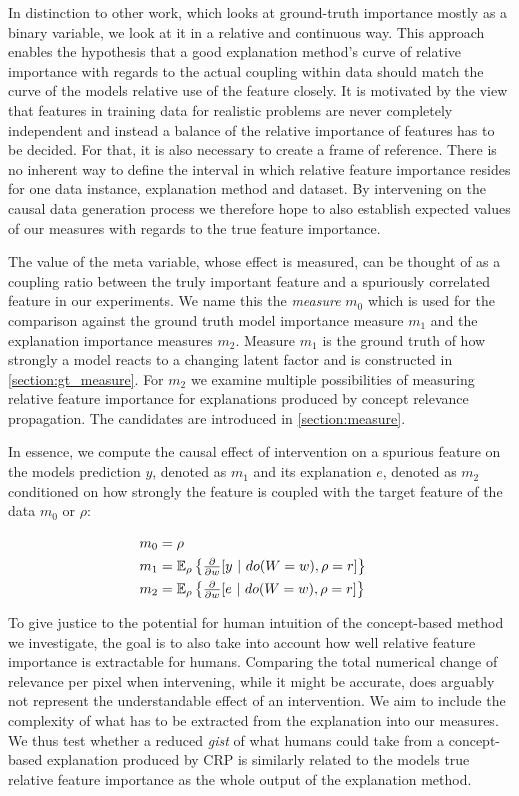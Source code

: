 In distinction to other work, which looks at ground-truth importance mostly as a binary variable, we look at it in a relative and continuous way. This approach enables the hypothesis that a good explanation method's curve of relative importance with regards to the actual coupling within data should match the curve of the models relative use of the feature closely. It is motivated by the view that features in training data for realistic problems are never completely independent and instead a balance of the relative importance of features has to be decided. For that, it is also necessary to create a frame of reference. There is no inherent way to define the interval in which relative feature importance resides for one data instance, explanation method and dataset. By intervening on the causal data generation process we therefore hope to also establish expected values of our measures with regards to the true feature importance.

The value of the meta variable, whose effect is measured, can be thought of as a coupling ratio between the truly important feature and a spuriously correlated feature in our experiments. We name this the \textit{measure} $m_0$ which is used for the comparison against the ground truth model importance measure $m_1$ and the explanation importance measures $m_2$. Measure $m_1$ is the ground truth of how strongly a model reacts to a changing latent factor and is constructed in \cref{section:gt_measure}. For $m_2$ we examine multiple possibilities of measuring relative feature importance for explanations produced by concept relevance propagation. The candidates are introduced in \autoref{section:measure}. 

In essence, we compute the causal effect of intervention on a spurious feature on the models prediction $y$, denoted as $m_1$ and its explanation $e$, denoted as $m_2$ conditioned on how strongly the feature is coupled with the target feature of the data $m_0$ or $\rho$:

\begin{align}\displaystyle
& m_0 = \rho & \\
& m_1 = \mathbb{E}_{\rho} \left\{ \tfrac{\partial}{\partial w} [ y \ | \ do(W=w), \rho= r ] \right\} & \\
& m_2 = \mathbb{E}_{\rho} \left\{ \tfrac{\partial}{\partial w} [ e \ | \ do(W=w), \rho = r ] \right\} 
\end{align}


To give justice to the potential for human intuition of the concept-based method we investigate, the goal is to also take into account how well relative feature importance is extractable for humans. Comparing the total numerical change of relevance per pixel when intervening, while it might be accurate, does arguably not represent the understandable effect of an intervention. We aim to include the complexity of what has to be extracted from the explanation into our measures. We thus test whether a reduced \textit{gist} of what humans could take from a concept-based explanation produced by CRP is similarly related to the models true relative feature importance as the whole output of the explanation method. 

